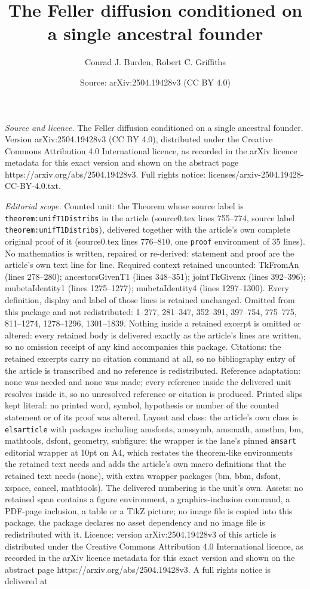 \documentclass[10pt,a4paper]{amsart}
\title[The Feller diffusion conditioned on a single ancestral found]{The Feller diffusion conditioned on a single ancestral founder}
\author{Conrad J. Burden, Robert C. Griffiths}
\date{Source: arXiv:2504.19428v3 (CC BY 4.0)}
\begin{document}
\maketitle

\noindent\emph{Source and licence.} The Feller diffusion conditioned on a single ancestral founder. Version arXiv:2504.19428v3 (CC BY 4.0), distributed under the Creative Commons Attribution 4.0 International licence, as recorded in the arXiv licence metadata for this exact version and shown on the abstract page https://arxiv.org/abs/2504.19428v3. Full rights notice: licenses/arxiv-2504.19428-CC-BY-4.0.txt.\par\smallskip

\noindent\textit{Editorial scope.} Counted unit: the Theorem whose source label is \texttt{theorem:unifT1Distribs} in the article (source0.tex lines 755--774, source label \texttt{theorem:unifT1Distribs}), delivered together with the article's own complete original proof of it (source0.tex lines 776--810, one \texttt{proof} environment of 35 lines). No mathematics is written, repaired or re-derived: statement and proof are the article's own text line for line. Required context retained uncounted: TkFromAn (lines 278--280); ancestorsGivenT1 (lines 348--351); jointTkGivenx (lines 392--396); mubetaIdentity1 (lines 1275--1277); mubetaIdentity4 (lines 1297--1300). Every definition, display and label of those lines is retained unchanged. Omitted from this package and not redistributed: 1--277, 281--347, 352--391, 397--754, 775--775, 811--1274, 1278--1296, 1301--1839. Nothing inside a retained excerpt is omitted or altered: every retained body is delivered exactly as the article's lines are written, so no omission receipt of any kind accompanies this package. Citations: the retained excerpts carry no citation command at all, so no bibliography entry of the article is transcribed and no reference is redistributed. Reference adaptation: none was needed and none was made; every reference inside the delivered unit resolves inside it, so no unresolved reference or citation is produced. Printed slips kept literal: no printed word, symbol, hypothesis or number of the counted statement or of its proof was altered. Layout and class: the article's own class is \texttt{elsarticle} with packages including amsfonts, amssymb, amsmath, amsthm, bm, mathtools, dsfont, geometry, subfigure; the wrapper is the lane's pinned \texttt{amsart} editorial wrapper at 10pt on A4, which restates the theorem-like environments the retained text needs and adds the article's own macro definitions that the retained text needs (none), with extra wrapper packages (bm, bbm, dsfont, xspace, cancel, mathtools). The delivered numbering is the unit's own. Assets: no retained span contains a figure environment, a graphics-inclusion command, a PDF-page inclusion, a table or a TikZ picture; no image file is copied into this package, the package declares no asset dependency and no image file is redistributed with it. Licence: version arXiv:2504.19428v3 of this article is distributed under the Creative Commons Attribution 4.0 International licence, as recorded in the arXiv licence metadata for this exact version and shown on the abstract page https://arxiv.org/abs/2504.19428v3. A full rights notice is delivered at 
\end{document}
